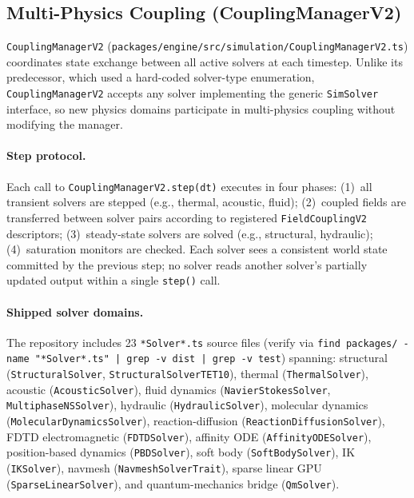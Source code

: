 \documentclass[sigconf,nonacm]{acmart}
\begin{document}
\subsection{Multi-Physics Coupling (CouplingManagerV2)}
\label{sec:worldmodel:coupling}

\texttt{CouplingManagerV2}
(\texttt{packages/engine/src/simulation/CouplingManagerV2.ts})
coordinates state exchange between all active solvers at each timestep.
Unlike its predecessor, which used a hard-coded solver-type enumeration,
\texttt{CouplingManagerV2} accepts any solver implementing the generic
\texttt{SimSolver} interface, so new physics domains participate in
multi-physics coupling without modifying the manager.

\paragraph{Step protocol.}
Each call to \texttt{CouplingManagerV2.step(dt)} executes in four
phases: (1)~all transient solvers are stepped (e.g., thermal, acoustic,
fluid); (2)~coupled fields are transferred between solver pairs
according to registered \texttt{FieldCouplingV2} descriptors;
(3)~steady-state solvers are solved (e.g., structural, hydraulic);
(4)~saturation monitors are checked.
Each solver sees a consistent world state committed by the previous
step; no solver reads another solver's partially updated output within
a single \texttt{step()} call.

\paragraph{Shipped solver domains.}
The repository includes 23 \texttt{*Solver*.ts} source files
(verify via \texttt{find packages/ -name "*Solver*.ts" |
grep -v dist | grep -v test}) spanning: structural
(\texttt{StructuralSolver}, \texttt{StructuralSolverTET10}), thermal
(\texttt{ThermalSolver}), acoustic (\texttt{AcousticSolver}), fluid
dynamics (\texttt{NavierStokesSolver}, \texttt{MultiphaseNSSolver}),
hydraulic (\texttt{HydraulicSolver}), molecular dynamics
(\texttt{MolecularDynamicsSolver}), reaction-diffusion
(\texttt{ReactionDiffusionSolver}), FDTD electromagnetic
(\texttt{FDTDSolver}), affinity ODE (\texttt{AffinityODESolver}),
position-based dynamics (\texttt{PBDSolver}), soft body
(\texttt{SoftBodySolver}), IK (\texttt{IKSolver}), navmesh
(\texttt{NavmeshSolverTrait}), sparse linear GPU
(\texttt{SparseLinearSolver}), and quantum-mechanics bridge
(\texttt{QmSolver}).
\end{document}

